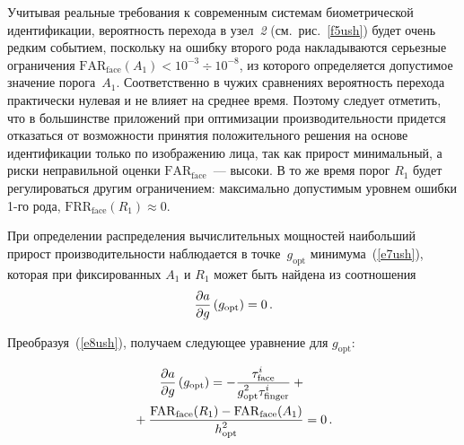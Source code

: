 \begin{multicols}{2}
     Учитывая реальные требования к современным системам биометрической
идентификации,  вероятность перехода в узел~\textit{2} (см.\ рис.~\ref{f5ush}) будет очень
редким событием, поскольку на ошибку второго рода накладываются серьезные
ограничения $\mathrm{FAR}_{\mathrm{face}} (A_1)< 10^{-3}\div 10^{-8}$, из которого
определяется допустимое значение порога~$A_1$. Соответственно в чужих сравнениях
вероятность перехода практически нулевая и не влияет на среднее время. Поэтому
следует отметить, что в большинстве приложений при оптимизации
производительности придется отказаться от возможности принятия положительного
решения на основе идентификации только по изображению лица, так как прирост
минимальный, а риски неправильной оценки $\mathrm{FAR}_{\mathrm{face}}$~---
высоки. В то же время порог $R_1$ будет регулироваться другим ограничением:
максимально допустимым уровнем ошибки 1-го рода,
$\mathrm{FRR}_{\mathrm{face}}(R_1)\approx 0$.


     При определении распределения вычислительных мощностей наибольший
прирост производительности наблюдается в точке~$g_{\mathrm{opt}}$
минимума~(\ref{e7ush}), которая при фиксированных $A_1$ и $R_1$ может быть
найдена из соотношения
     \begin{equation}
     \displaystyle\frac{\displaystyle \partial a\mathstrut}{\displaystyle \partial g\mathstrut}\left ( g_{\mathrm{opt}} \right ) =0\,.
     \label{e8ush}
     \end{equation}

     Преобразуя~(\ref{e8ush}), получаем следующее уравнение для $g_{\mathrm{opt}}$:
     
     \noindent
     \begin{multline*}
     \displaystyle\frac{\displaystyle \partial a\mathstrut}{\displaystyle \partial g\mathstrut}\left (g_{\mathrm{opt}}\right ) =
 -
\displaystyle\frac{\displaystyle \tau^i_{\mathrm{face}}\mathstrut}{\displaystyle g^2_{\mathrm{opt}} \tau^i_{\mathrm{finger}}\mathstrut}+{}\\
{}+\displaystyle\frac{\displaystyle 
\mathrm{FAR}_{\mathrm{face}}(R_1)-\mathrm{FAR}_{\mathrm{face}}(A_1)\mathstrut}{\displaystyle h^2_{\mathrm{opt}}\mathstrut} =0\,.
     \end{multline*}


\end{multicols}
